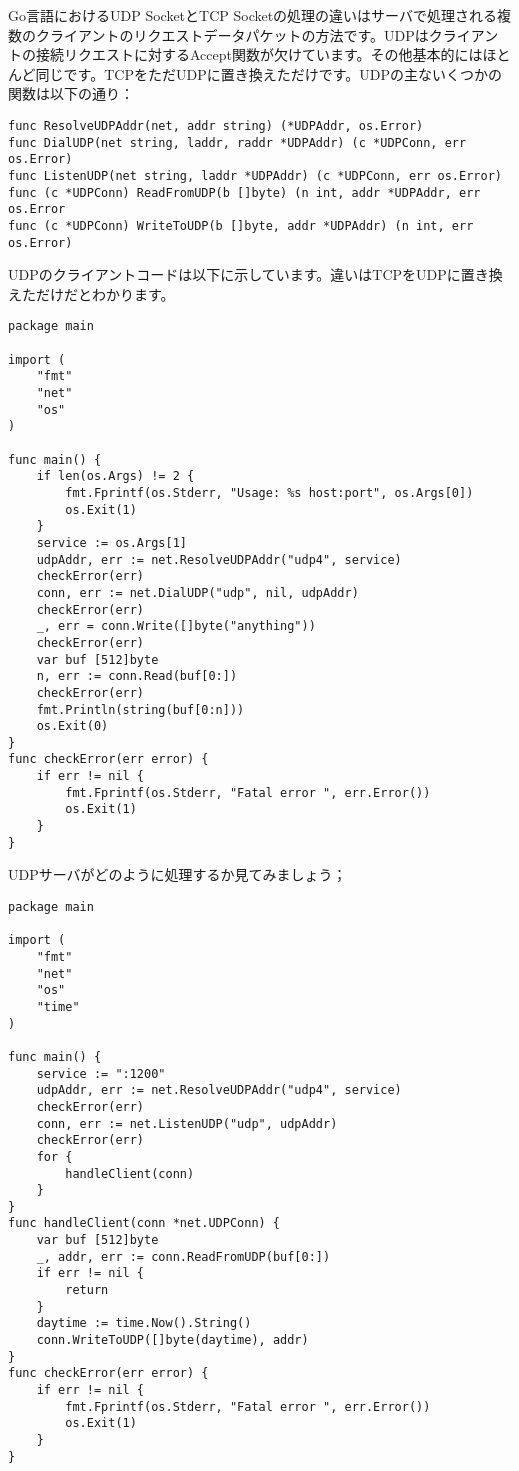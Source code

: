 Go言語におけるUDP SocketとTCP Socketの処理の違いはサーバで処理される複数のクライアントのリクエストデータパケットの方法です。UDPはクライアントの接続リクエストに対するAccept関数が欠けています。その他基本的にはほとんど同じです。TCPをただUDPに置き換えただけです。UDPの主ないくつかの関数は以下の通り：

\begin{lstlisting}[numbers=none]
func ResolveUDPAddr(net, addr string) (*UDPAddr, os.Error)
func DialUDP(net string, laddr, raddr *UDPAddr) (c *UDPConn, err os.Error)
func ListenUDP(net string, laddr *UDPAddr) (c *UDPConn, err os.Error)
func (c *UDPConn) ReadFromUDP(b []byte) (n int, addr *UDPAddr, err os.Error
func (c *UDPConn) WriteToUDP(b []byte, addr *UDPAddr) (n int, err os.Error)
\end{lstlisting}

UDPのクライアントコードは以下に示しています。違いはTCPをUDPに置き換えただけだとわかります。

\begin{lstlisting}[numbers=none]
package main

import (
    "fmt"
    "net"
    "os"
)

func main() {
    if len(os.Args) != 2 {
        fmt.Fprintf(os.Stderr, "Usage: %s host:port", os.Args[0])
        os.Exit(1)
    }
    service := os.Args[1]
    udpAddr, err := net.ResolveUDPAddr("udp4", service)
    checkError(err)
    conn, err := net.DialUDP("udp", nil, udpAddr)
    checkError(err)
    _, err = conn.Write([]byte("anything"))
    checkError(err)
    var buf [512]byte
    n, err := conn.Read(buf[0:])
    checkError(err)
    fmt.Println(string(buf[0:n]))
    os.Exit(0)
}
func checkError(err error) {
    if err != nil {
        fmt.Fprintf(os.Stderr, "Fatal error ", err.Error())
        os.Exit(1)
    }
}
\end{lstlisting}

UDPサーバがどのように処理するか見てみましょう；

\begin{lstlisting}[numbers=none]
package main

import (
    "fmt"
    "net"
    "os"
    "time"
)

func main() {
    service := ":1200"
    udpAddr, err := net.ResolveUDPAddr("udp4", service)
    checkError(err)
    conn, err := net.ListenUDP("udp", udpAddr)
    checkError(err)
    for {
        handleClient(conn)
    }
}
func handleClient(conn *net.UDPConn) {
    var buf [512]byte
    _, addr, err := conn.ReadFromUDP(buf[0:])
    if err != nil {
        return
    }
    daytime := time.Now().String()
    conn.WriteToUDP([]byte(daytime), addr)
}
func checkError(err error) {
    if err != nil {
        fmt.Fprintf(os.Stderr, "Fatal error ", err.Error())
        os.Exit(1)
    }
}
\end{lstlisting}
